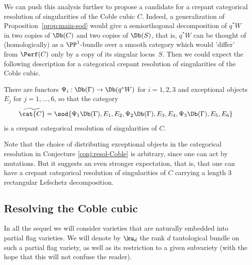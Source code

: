 We can push this analysis further to propose a candidate for a crepant categorical resolution of singularities
of the Coble cubic $C$. Indeed, a generalization of Proposition~\ref{prop:main-sod} would give a semiorthogonal
decomposition of $q^* W$ in two copies of $\Db(C)$ and two copies of $\Db(S)$, that is, $q^* W$ can be thought of
(homologically) as a $\PP^1$\nobreakdash-bundle over a smooth category which would 'differ' from $\Perf(C)$ only
by a copy of its singular locus~$S$. Then we could expect the following description for a categorical crepant
resolution of singularities of the Coble cubic.

\begin{conjecture}\label{conj:resol-Coble}
There are functors $\Psi_i: \Db(\Gamma) \to \Db(q^* W)$ for $i=1,2,3$ and exceptional objects $E_j$
for $j=1,\ldots,6$, so that the category
\[
\widetilde{\cat{C}}= \sod{\Psi_1 \Db(\Gamma),E_1,E_2,\Psi_2 \Db(\Gamma),E_3,E_4,\Psi_3 \Db(\Gamma),E_5,E_6}
\]
is a crepant categorical resolution of singularities of $C$.
\end{conjecture}
Note that the choice of distributing exceptional objects in the categorical resolution in Conjecture
\ref{conj:resol-Coble} is arbitrary, since one can act by mutations. But it suggests an even stronger
expectation, that is, that one can have a crepant categorical resolution of singularities of $C$
carrying a length 3 rectangular Lefschetz decomposition.

\subsection{Resolving the Coble cubic}
In all the sequel we will consider varieties that are naturally embedded into partial
flag varieties. We will denote by $\ku_d$ the rank $d$ tautological bundle on such a
partial flag variety, as well as its restriction to a given subvariety (with the hope
that this will not confuse the reader).

